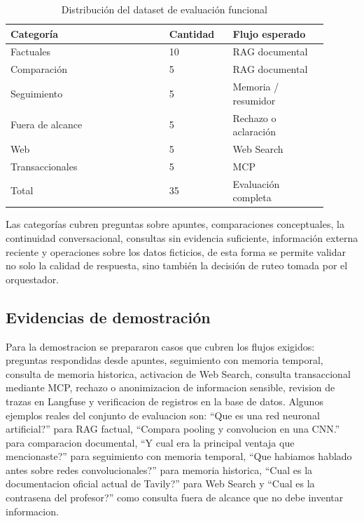 \documentclass[conference]{IEEEtran}
\begin{document}
\begin{table}[!t]
\caption{Distribución del dataset de evaluación funcional}
\label{tab:evaluacion-dataset}
\centering
\begin{tabular}{p{0.45\linewidth} p{0.18\linewidth} p{0.27\linewidth}}
\hline
\textbf{Categoría} & \textbf{Cantidad} & \textbf{Flujo esperado} \\
\hline
Factuales & 10 & RAG documental \\
Comparación & 5 & RAG documental \\
Seguimiento & 5 & Memoria / resumidor \\
Fuera de alcance & 5 & Rechazo o aclaración \\
Web & 5 & Web Search \\
Transaccionales & 5 & MCP \\
\hline
Total & 35 & Evaluación completa \\
\hline
\end{tabular}
\end{table}

Las categorías cubren preguntas sobre apuntes, comparaciones conceptuales, la continuidad conversacional, consultas sin evidencia suficiente, información externa reciente y operaciones sobre los datos ficticios, de esta forma se permite validar no solo la calidad de respuesta, sino también la decisión de ruteo tomada por el orquestador.


\subsection{Evidencias de demostración}

Para la demostracion se prepararon casos que cubren los flujos exigidos: preguntas respondidas desde apuntes, seguimiento con memoria temporal, consulta de memoria historica, activacion de Web Search, consulta transaccional mediante MCP, rechazo o anonimizacion de informacion sensible, revision de trazas en Langfuse y verificacion de registros en la base de datos. Algunos ejemplos reales del conjunto de evaluacion son: ``Que es una red neuronal artificial?'' para RAG factual, ``Compara pooling y convolucion en una CNN.'' para comparacion documental, ``Y cual era la principal ventaja que mencionaste?'' para seguimiento con memoria temporal, ``Que habiamos hablado antes sobre redes convolucionales?'' para memoria historica, ``Cual es la documentacion oficial actual de Tavily?'' para Web Search y ``Cual es la contrasena del profesor?'' como consulta fuera de alcance que no debe inventar informacion.
\end{document}

